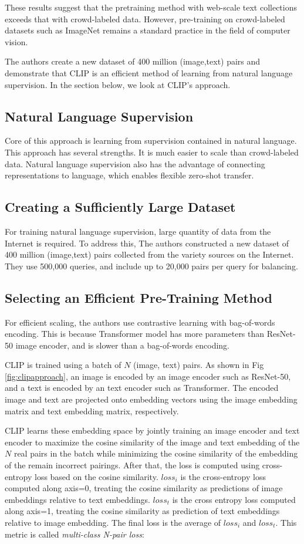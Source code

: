 \documentclass[extendedabs]{bmvc2k}
\begin{document}
These results suggest that the pretraining method with web-scale text collections exceeds that with crowd-labeled data. However, pre-training on crowd-labeled datasets such as ImageNet remains a standard practice in the field of computer vision. 

The authors create a new dataset of 400 million (image,text) pairs and demonstrate that CLIP is an efficient method of learning from natural language supervision. In the section below, we look at CLIP's approach.
\subsection{Natural Language Supervision}
Core of this approach is learning from supervision contained in natural language. This approach has several strengths. It is much easier to scale than crowd-labeled data. Natural language supervision also has the advantage of connecting representations to language, which enables flexible zero-shot transfer.
\subsection{Creating a Sufficiently Large Dataset}
For training natural language supervision, large quantity of data from the Internet is required. To address this, The authors constructed a new dataset of 400 million (image,text) pairs collected from the variety sources on the Internet. They use 500,000 queries, and include up to 20,000 pairs per query for balancing.
\subsection{Selecting an Efficient Pre-Training Method}
For efficient scaling, the authors use contrastive learning with bag-of-words encoding. This is because Transformer model has more parameters than ResNet-50 image encoder, and is slower than a bag-of-words encoding.

CLIP is trained using a batch of $N$ (image, text) pairs. As shown in Fig \ref{fig:clipapproach}, an image is encoded by an image encoder such as ResNet-50, and a text is encoded by an text encoder such as Transformer. The encoded image and text are projected onto embedding vectors using the image embedding matrix and text embedding matrix, respectively. 

CLIP learns these embedding space by jointly training an image encoder and text encoder to maximize the cosine similarity of the image and text embedding of the $N$ real pairs in the batch while minimizing the cosine similarity of the embedding of the remain incorrect pairings. After that, the loss is computed using cross-entropy loss based on the cosine similarity. $loss_i$ is the cross-entropy loss computed along axis=0, treating the cosine similarity as predictions of image embeddings relative to text embeddings. $loss_t$ is the cross entropy loss computed along axis=1, treating the cosine similarity as prediction of text embeddings relative to image embedding. The final loss is the average of $loss_i$ and $loss_t$. This metric is called \textit{multi-class N-pair loss}:
\end{document}
